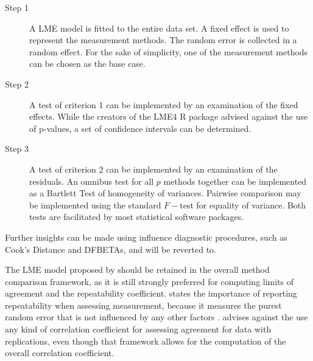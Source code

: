 \documentclass[12pt, a4paper]{report}
\theoremstyle{plain}
\theoremstyle{definition}
\theoremstyle{remark}
\begin{document}
\begin{description}
\item[Step 1] A LME model is fitted to the entire data set. A fixed effect is used to represent the measurement methods. The random error is collected in a random effect. For the sake of simplicity, one of the measurement methods can be chosen as the base case.

\item[Step 2] A test of criterion 1 can be implemented by an examination of the fixed effects. While the creators of the LME4 R package advised against the use of p-values, a set of confidence intervals can be determined.

\item[Step 3] A test of criterion 2 can be implemented by an examination of the residuals. An omnibus test for all $p$ methods together can be implemented as a Bartlett Test of homogeneity of variances. Pairwise comparison may be implemented using the standard $F-$test for equality of variance. Both tests are facilitated by most statistical software packages.
\end{description}

Further insights can be made using influence diagnostic procedures, such as Cook's Distance and DFBETAs, and will be reverted to.


The LME model proposed by \citet{ARoy2009} should be retained in the overall method comparison framework, as it is still strongly preferred for computing limits of agreement and the repeatability coefficient.
\citet{ARoy2009} states the importance of reporting repeatability when assessing measurement, because it measures the purest
random error that is not influenced by any other factors \citep{Barnhart}.
\citet{ARoy2009} advises against the use any kind of correlation coefficient for assessing agreement for data with replications, even though that framework allows for the computation of the overall correlation coefficient.



\newpage
\end{document}
